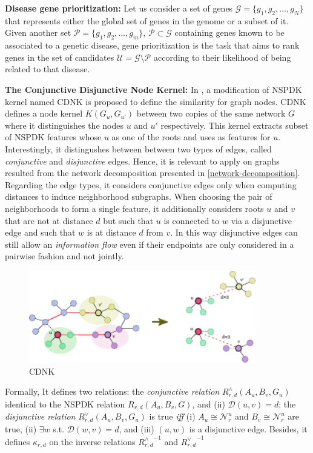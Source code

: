 \textbf{Disease gene prioritization:} Let us consider a set of genes $\mathcal{G} = \lbrace g_1, g_2, \ldots, g_N \rbrace$ that represents either the global set of genes in the genome or a subset of it. Given another set $\mathcal{P} = \lbrace g_1, g_2, \ldots, g_m \rbrace, \, \mathcal{P} \subset \mathcal{G}$ containing genes known to be associated to a genetic disease, gene prioritization is the task that aims to rank genes in the set of candidates $\mathcal{U} = \mathcal{G} \setminus \mathcal{P}$ according to their likelihood of being related to that disease.

\textbf{The Conjunctive Disjunctive Node Kernel:} In \cite{cdnk}, a modification of NSPDK kernel \cite{nspdk} named CDNK is proposed to define the similarity for graph nodes. CDNK defines a node kernel $K(G_u,G_{u'})$ between two copies of the same network $G$ where it distinguishes the nodes $u$ and $u'$ respectively. This kernel extracts subset of NSPDK features whose $u$ as one of the roots and uses as features for $u$. Interestingly, it distingushes between between two types of edges, called {\em conjunctive} and {\em disjunctive} edges. Hence, it is relevant to apply on graphs resulted from the network decomposition presented in \ref{network-decomposition}. Regarding the edge types, it considers conjunctive edges only when computing distances to induce neighborhood subgraphs. When choosing the pair of neighborhoods to form a single feature, it additionally considers roots $u$ and $v$ that are not at distance $d$ but such that $u$ is connected to $w$ via a disjunctive edge and such that $w$ is at distance $d$ from $v$. In this way disjunctive edges can still allow an {\em information flow} even if their endpoints are only considered in a pairwise fashion and not jointly. 

\begin{figure}[ht]
\includegraphics[width=0.9\columnwidth, height=4cm]{img/cdnk.pdf}
\caption{CDNK}
\label{fig:01}
\end{figure}

Formally, It defines two relations: the \textit{conjunctive relation} $R^{\wedge}_{r,d}(A_u, B_v, G_u)$ identical to the NSPDK relation $R_{r,d}(A_u, B_v, G)$,  and (ii) $\mathcal{D}(u,v)= d$; the \textit{disjunctive relation} $R_{r,d}^{\vee}(A_u, B_v, G_u)$ is true {\em iff} (i)  $A_u \cong \mathcal{N}_r^u$ and $B_v \cong \mathcal{N}_r^u$ are true, (ii) $\exists w$ s.t. $\mathcal{D}(w,v)= d$, and (iii) $(u,w)$ is a disjunctive edge. Besides, it defines $\kappa_{r,d}$ on the  inverse relations ${R^{\wedge}_{r,d}}^{ -1}$ and ${R^{\vee}_{r,d}}^{ -1}$ \vspace{8pt}\\

